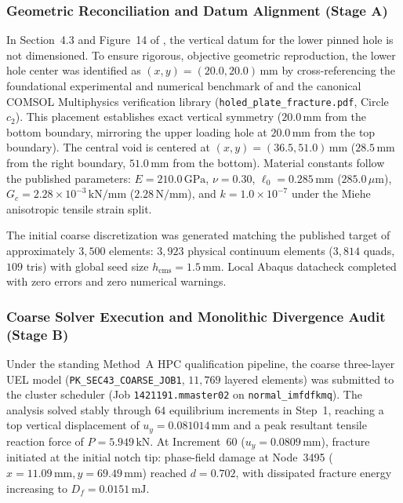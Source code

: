 \subsubsection{Geometric Reconciliation and Datum Alignment (Stage A)}
In Section~4.3 and Figure~14 of \citet{pandey2025}, the vertical datum for the lower pinned hole is not dimensioned. To ensure rigorous, objective geometric reproduction, the lower hole center was identified as $(x, y) = (20.0, 20.0)\,\mathrm{mm}$ by cross-referencing the foundational experimental and numerical benchmark of \citet{ambati2015} and the canonical COMSOL Multiphysics verification library (\texttt{holed\_plate\_fracture.pdf}, Circle $c_2$). This placement establishes exact vertical symmetry ($20.0\,\mathrm{mm}$ from the bottom boundary, mirroring the upper loading hole at $20.0\,\mathrm{mm}$ from the top boundary). The central void is centered at $(x, y) = (36.5, 51.0)\,\mathrm{mm}$ ($28.5\,\mathrm{mm}$ from the right boundary, $51.0\,\mathrm{mm}$ from the bottom). Material constants follow the published parameters: $E = 210.0\,\mathrm{GPa}$, $\nu = 0.30$, $\ell_0 = 0.285\,\mathrm{mm}$ ($285.0\,\mu\mathrm{m}$), $G_c = 2.28 \times 10^{-3}\,\mathrm{kN/mm}$ ($2.28\,\mathrm{N/mm}$), and $k = 1.0 \times 10^{-7}$ under the Miehe anisotropic tensile strain split.

The initial coarse discretization was generated matching the published target of approximately $3{,}500$ elements: $3{,}923$ physical continuum elements ($3{,}814$ quads, $109$ tris) with global seed size $h_{\mathrm{cms}} = 1.5\,\mathrm{mm}$. Local Abaqus datacheck completed with zero errors and zero numerical warnings.

\subsubsection{Coarse Solver Execution and Monolithic Divergence Audit (Stage B)}
Under the standing Method~A HPC qualification pipeline, the coarse three-layer UEL model (\texttt{PK\_SEC43\_COARSE\_JOB1}, $11{,}769$ layered elements) was submitted to the cluster scheduler (Job \texttt{1421191.mmaster02} on \texttt{normal\_imfdfkmq}). The analysis solved stably through $64$ equilibrium increments in Step~1, reaching a top vertical displacement of $u_y = 0.081014\,\mathrm{mm}$ and a peak resultant tensile reaction force of $P = 5.949\,\mathrm{kN}$. At Increment~60 ($u_y = 0.0809\,\mathrm{mm}$), fracture initiated at the initial notch tip: phase-field damage at Node~3495 ($x = 11.09\,\mathrm{mm}, y = 69.49\,\mathrm{mm}$) reached $d = 0.702$, with dissipated fracture energy increasing to $D_f = 0.0151\,\mathrm{mJ}$.

